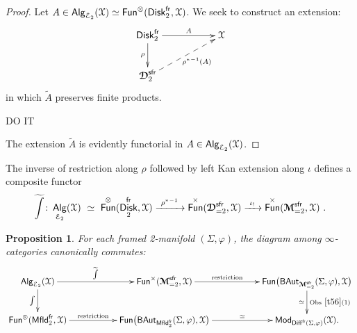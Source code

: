 \documentclass{amsart}
\newtheorem{prop}[theorem]{Proposition}
\theoremstyle{definition}
\theoremstyle{remark}
\DeclareMathOperator{\Alg}{\sf Alg}
\DeclareMathOperator{\Mod}{\sf Mod}
\DeclareMathOperator{\End}{\sf End}
\DeclareMathOperator{\Fun}{{\sf Fun}}
\DeclareMathOperator{\Diff}{{\sf Diff}}
\DeclareMathOperator{\Mfld}{{\sf Mfld}}
\DeclareMathOperator{\Disk}{{\sf Disk}}
\DeclareMathOperator{\fr}{\sf fr}
\DeclareMathOperator{\sfr}{\sf sfr}
\def\ot{\otimes}
\newcommand{\w}{\widetilde}
\newcommand{\xra}{\xrightarrow}
\def\cE{\mathcal E}\def\cF{\mathcal F}\def\cG{\mathcal G}\def\cH{\mathcal H}
\def\bcD{\boldsymbol{\mathcal D}}\def\bcE{\boldsymbol{\mathcal E}}\def\bcF{\boldsymbol{\mathcal F}}
\def\bcM{\boldsymbol{\mathcal M}}\def\bcN{\boldsymbol{\mathcal N}}\def\bcO{\boldsymbol{\mathcal O}}\def\bcP{\boldsymbol{\mathcal P}}\def\bcQ{\boldsymbol{\mathcal Q}}\def\bcR{\boldsymbol{\mathcal R}}
\def\bcM{\boldsymbol{\mathcal M}}
\begin{document}
\begin{proof}
Let $A\in \Alg_{\cE_2}(\cX)\simeq \Fun^{\ot}(\Disk_2^{\fr} , \cX)$.
We seek to construct an extension:
\begin{equation}
\label{e80}
\xymatrix{
\Disk_2^{\fr}
\ar[rr]^-{A}
\ar[d]_-{\rho}
&&
\cX
\\
\bcD_{2}^{\sfr}
\ar@{-->}[urr]_-{{\rho^\ast}^{-1}(A)}
&&
}
\end{equation}
in which $\w{A}$ preserves finite products.
{\color{magenta}

DO IT

}
The extension $\w{A}$ is evidently functorial in $A\in \Alg_{\cE_2}(\cX)$.  



\end{proof}


The inverse of restriction along $\rho$ followed by left Kan extension along $\iota$ defines a composite functor
\[
\w{\int}
\colon
\Alg_{\cE_2}(\cX)
~\simeq~
\Fun^{\ot}( \Disk_2^{\fr} , \cX )
\xra{~{\rho^\ast}^{-1}~}
\Fun^{\times}( \bcD_{=2}^{\sfr} , \cX )
\xra{~\iota_!~}
\Fun^{\times}( \bcM_{=2}^{\sfr} , \cX )
~.
\]


\begin{prop}
\label{t57}
For each framed 2-manifold $(\Sigma,\varphi)$, the diagram among $\infty$-categories canonically commutes:
\[
\xymatrix{
\Alg_{\cE_2}(\cX)
\ar[rr]^-{\w{\int}}
\ar[d]_-{\int}
&&
\Fun^{\times}( \bcM_{=2}^{\sfr} , \cX )
\ar[rr]^-{\rm restriction}
&&
\Fun\bigl( {\sf BAut}_{\bcM_{=2}^{\sfr}}(\Sigma,\varphi) , \cX \bigr)
\ar[d]_-{\simeq}^-{\rm Obs~\ref{t56}(1)}
\\
\Fun^{\ot}( \Mfld_2^{\fr}, \cX )
\ar[rr]^-{\rm restriction}
&&
\Fun\bigl( {\sf BAut}_{\Mfld_2^{\fr}}(\Sigma,\varphi) , \cX \bigr)
\ar[rr]^-{\simeq}
&&
\Mod_{\Diff^{\fr}(\Sigma,\varphi)}(\cX)
.
}
\]

\end{prop}
\end{document}
